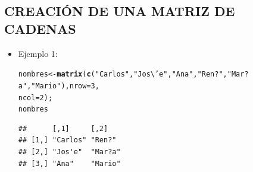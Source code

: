 \documentclass[12pt,letterpaper]{article}\usepackage[]{graphicx}\usepackage[]{color}
\makeatletter
\newcommand{\hlnum}[1]{\textcolor[rgb]{0.686,0.059,0.569}{#1}}%
\newcommand{\hlstr}[1]{\textcolor[rgb]{0.192,0.494,0.8}{#1}}%
\newcommand{\hlstd}[1]{\textcolor[rgb]{0.345,0.345,0.345}{#1}}%
\newcommand{\hlkwb}[1]{\textcolor[rgb]{0.69,0.353,0.396}{#1}}%
\newcommand{\hlkwc}[1]{\textcolor[rgb]{0.333,0.667,0.333}{#1}}%
\newcommand{\hlkwd}[1]{\textcolor[rgb]{0.737,0.353,0.396}{\textbf{#1}}}%
\newenvironment{kframe}{%
 \def\at@end@of@kframe{}%
 \ifinner\ifhmode%
  \def\at@end@of@kframe{\end{minipage}}%
  \begin{minipage}{\columnwidth}%
 \fi\fi%
 \def\FrameCommand##1{\hskip\@totalleftmargin \hskip-\fboxsep
 \colorbox{shadecolor}{##1}\hskip-\fboxsep
     \hskip-\linewidth \hskip-\@totalleftmargin \hskip\columnwidth}%
 \MakeFramed {\advance\hsize-\width
   \@totalleftmargin\z@ \linewidth\hsize
   \@setminipage}}%
 {\par\unskip\endMakeFramed%
 \at@end@of@kframe}
\newenvironment{knitrout}{}{} %
\makeatother
\begin{document}
\subsection{CREACI\'ON DE UNA MATRIZ DE CADENAS}
\begin{itemize}
\item Ejemplo 1:
\begin{knitrout}
\color{fgcolor}\begin{kframe}
\begin{alltt}
\hlstd{nombres} \hlkwb{<-} \hlkwd{matrix}\hlstd{(}\hlkwd{c}\hlstd{(}\hlstr{"Carlos"}\hlstd{,} \hlstr{"Jos\textbackslash{}'e"}\hlstd{,} \hlstr{"Ana"}\hlstd{,} \hlstr{"Ren?"}\hlstd{,} \hlstr{"Mar?a"}\hlstd{,} \hlstr{"Mario"}\hlstd{),}\hlkwc{nrow}\hlstd{=}\hlnum{3}\hlstd{,}
                  \hlkwc{ncol}\hlstd{=}\hlnum{2}\hlstd{);}
\hlstd{nombres}
\end{alltt}
\begin{verbatim}
##      [,1]     [,2]   
## [1,] "Carlos" "Ren?" 
## [2,] "Jos'e"  "Mar?a"
## [3,] "Ana"    "Mario"
\end{verbatim}
\end{kframe}
\end{knitrout}
\end{itemize}
\end{document}
